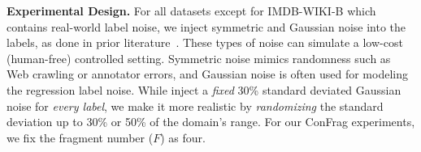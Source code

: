\documentclass{article}
\theoremstyle{plain}
\theoremstyle{definition}
\theoremstyle{remark}
\begin{document}
\textbf{Experimental Design.}
For all datasets except for IMDB-WIKI-B which contains real-world label noise, 
we inject symmetric and Gaussian noise into the labels, as done in prior literature~\citep{yao22cmixup, yi19pencil,wei20jocor}.
These types of noise can simulate a low-cost (human-free) controlled setting. 
Symmetric noise mimics randomness such as Web crawling or annotator errors, and
Gaussian noise is often used for modeling the regression label noise. %
While \citet{yao22cmixup} inject a \textit{fixed} 30\% standard deviated Gaussian noise for \textit{every label},
we make it more realistic by \textit{randomizing} the standard deviation up to 30\% or 50\% of the domain's range.
For our ConFrag experiments, we fix the fragment number ($F$) as four. %
\end{document}
